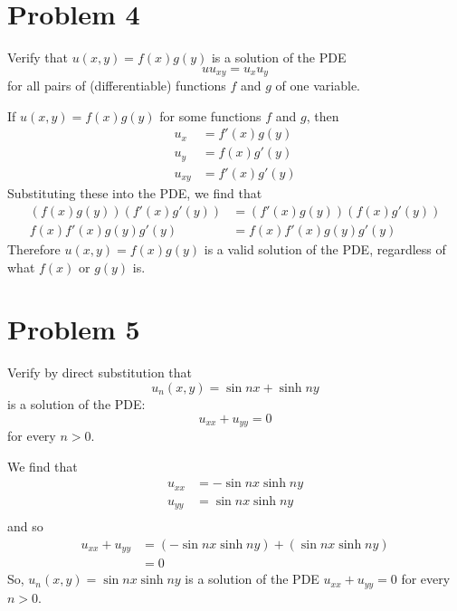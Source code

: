 \documentclass{ben}
\begin{document}
    \section{Problem 4}
    Verify that $u(x, y) = f(x)g(y)$ is a solution of the PDE
    \[
        uu_{xy} = u_x u_y
    \]
    for all pairs of (differentiable) functions $f$ and $g$ of one variable.
    \begin{solution}
        If $u(x, y) = f(x)g(y)$ for some functions $f$ and $g$, then
        \begin{align*}
            u_x &= f'(x)g(y)\\
            u_y &= f(x)g'(y)\\
            u_{xy} &= f'(x)g'(y)
        \end{align*}
        Substituting these into the PDE, we find that
        \begin{align*}
            (f(x)g(y))(f'(x)g'(y)) &= (f'(x)g(y))(f(x)g'(y))\\
            f(x)f'(x)g(y)g'(y) &= f(x)f'(x)g(y)g'(y)
        \end{align*}
        Therefore $u(x, y) = f(x)g(y)$ is a valid solution of the PDE, regardless
        of what $f(x)$ or $g(y)$ is.
    \end{solution}
    \section{Problem 5}
    Verify by direct substitution that
    \[
        u_n(x, y) = \sin nx + \sinh ny
    \]
    is a solution of the PDE:
    \[
        u_{xx} + u_{yy} = 0
    \]
    for every $n > 0$.
    \begin{solution}
        We find that
        \begin{align*}
            u_{xx} &= -\sin nx \sinh ny\\
            u_{yy} &= \sin nx \sinh ny\\
        \end{align*}
        and so
        \begin{align*}
            u_{xx} + u_{yy} &= (-\sin nx \sinh ny) + (\sin nx \sinh ny)\\
            &= 0
        \end{align*}
        So, $u_n(x, y) = \sin nx \sinh ny$ is a solution of the PDE $u_{xx} + u_{yy} = 0$
        for every $n > 0$.
    \end{solution}
\end{document}
